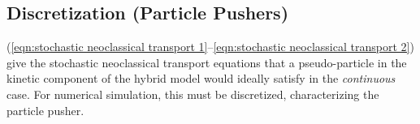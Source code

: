 \subsection{Discretization (Particle Pushers)}\label{cha:particle pushers}
    (\ref{eqn:stochastic neoclassical transport 1}--\ref{eqn:stochastic neoclassical transport 2}) give the stochastic neoclassical transport equations that a pseudo-particle in the kinetic component of the hybrid model would ideally satisfy in the \emph{continuous} case. For numerical simulation, this must be discretized, characterizing the particle pusher.


    
    
    